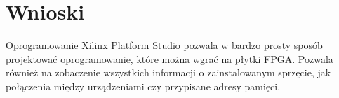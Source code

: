 \section{Wnioski}
Oprogramowanie Xilinx Platform Studio pozwala w bardzo prosty sposób projektować
oprogramowanie, które można wgrać na płytki FPGA. Pozwala również na zobaczenie wszystkich
informacji o zainstalowanym sprzęcie, jak połączenia między urządzeniami czy przypisane adresy
pamięci.
